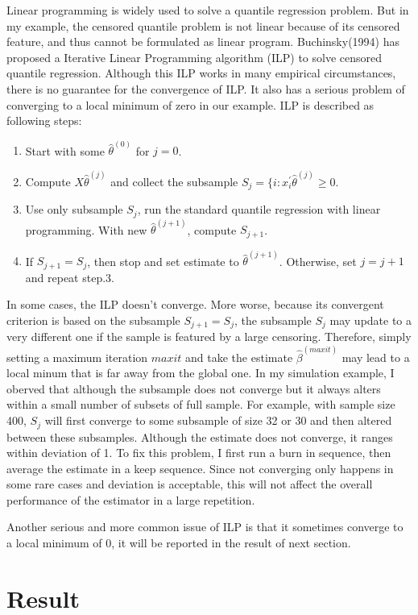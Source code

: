 \documentclass[12pt]{article}
\theoremstyle{plain} \newtheorem{theorem}{Theorem}
\theoremstyle{definition} \newtheorem{definition}{Definition}
\begin{document}
Linear programming is widely used to solve a quantile regression problem. But in my example, the censored quantile problem is not linear because of its censored feature, and thus cannot be formulated as linear program. Buchinsky(1994) has proposed a Iterative Linear Programming algorithm (ILP) to solve censored quantile regression. Although this ILP works in many empirical circumstances, there is no guarantee for the convergence of ILP. It also has a serious problem of converging to a local minimum of zero in our example. ILP is described as following steps:
\begin{enumerate}
    \item Start with some $\hat{\theta}^{(0)}$ for $j=0$.
    \item Compute $X\hat{\theta}^{(j)}$ and collect the subsample $S_j = \{ i: x_i^{'}\hat{\theta}^{(j)}\geq 0$.
    \item Use only subsample $S_j$, run the standard quantile regression with linear programming. With new $\hat{\theta}^{(j+1)}$, compute $S_{j+1}$.
    \item If $S_{j+1} = S_j$, then stop and set estimate to $\hat{\theta}^{(j+1)}$. Otherwise, set $j=j+1$ and repeat step.3.
\end{enumerate}
In some cases, the ILP doesn't converge. More worse, because its convergent criterion is based on the subsample $S_{j+1}=S_j$, the subsample $S_j$ may update to a very different one if the sample is featured by a large censoring. Therefore, simply setting a maximum iteration $maxit$ and take the estimate $\hat{\beta}^{(maxit)}$ may lead to a local minum that is far away from the global one. In my simulation example, I oberved that although the subsample does not converge but it always alters within a small number of subsets of full sample. For example, with sample size 400, $S_j$ will first converge to some subsample of size 32 or 30 and then altered between these subsamples. Although the estimate does not converge, it ranges within deviation of 1. To fix this problem, I first run a burn in sequence, then average the estimate in a keep sequence. Since not converging only happens in some rare cases and deviation is acceptable, this will not affect the overall performance of the estimator in a large repetition.

Another serious and more common issue of ILP is that it sometimes converge to a local minimum of 0, it will be reported in the result of next section.

\section{Result}
\label{sec:result}
\end{document}
